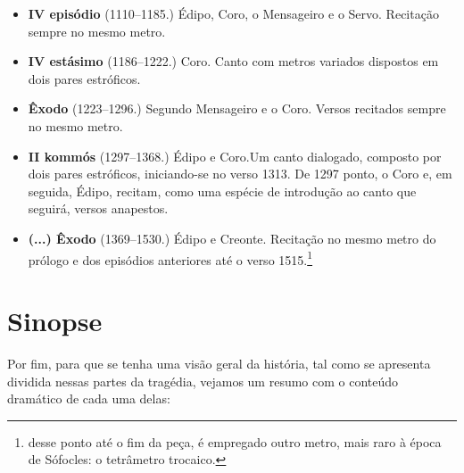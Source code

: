 \begin{itemize}
\item \textbf{IV episódio} (1110--1185.)        
	 {Édipo, Coro, o Mensageiro e o Servo}. Recitação sempre no mesmo metro. 

\item \textbf{IV estásimo} (1186--1222.)        
	 {Coro}. Canto com metros variados dispostos em dois pares estróficos. 

\item \textbf{Êxodo} (1223--1296.)                  
	 {Segundo Mensageiro e o Coro}. Versos recitados sempre no mesmo metro. 

\item \textbf{II kommós} (1297--1368.)         
	 {Édipo e Coro}.Um canto dialogado, composto por dois pares estróficos, iniciando-se no verso 1313. De 1297 
	 ponto, o Coro e, em seguida, Édipo, recitam, como uma espécie de introdução ao canto que seguirá, versos anapestos.

\item \textbf{(...) Êxodo} (1369--1530.)   
	 {Édipo e Creonte}. Recitação no mesmo metro do prólogo e dos episódios anteriores até o verso 1515.\footnote{
	 desse ponto até o fim da peça, é empregado outro metro, mais raro à época de Sófocles: o tetrâmetro trocaico.}  
\end{itemize}

\section{Sinopse}

Por fim, para que se tenha uma visão geral da história, tal como se
apresenta dividida nessas partes da tragédia, vejamos um resumo com o
conteúdo dramático de cada uma delas:

